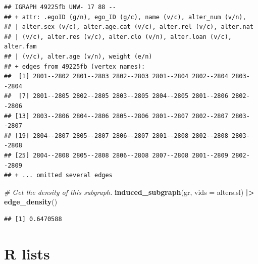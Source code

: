 \documentclass[
]{book}
\newenvironment{Shaded}{\begin{snugshade}}{\end{snugshade}}
\newcommand{\AttributeTok}[1]{\textcolor[rgb]{0.13,0.29,0.53}{#1}}
\newcommand{\CommentTok}[1]{\textcolor[rgb]{0.56,0.35,0.01}{\textit{#1}}}
\newcommand{\FunctionTok}[1]{\textcolor[rgb]{0.13,0.29,0.53}{\textbf{#1}}}
\newcommand{\NormalTok}[1]{#1}
\newcommand{\SpecialCharTok}[1]{\textcolor[rgb]{0.81,0.36,0.00}{\textbf{#1}}}
\begin{document}
\begin{verbatim}
## IGRAPH 49225fb UNW- 17 88 -- 
## + attr: .egoID (g/n), ego_ID (g/c), name (v/c), alter_num (v/n),
## | alter.sex (v/c), alter.age.cat (v/c), alter.rel (v/c), alter.nat
## | (v/c), alter.res (v/c), alter.clo (v/n), alter.loan (v/c), alter.fam
## | (v/c), alter.age (v/n), weight (e/n)
## + edges from 49225fb (vertex names):
##  [1] 2801--2802 2801--2803 2802--2803 2801--2804 2802--2804 2803--2804
##  [7] 2801--2805 2802--2805 2803--2805 2804--2805 2801--2806 2802--2806
## [13] 2803--2806 2804--2806 2805--2806 2801--2807 2802--2807 2803--2807
## [19] 2804--2807 2805--2807 2806--2807 2801--2808 2802--2808 2803--2808
## [25] 2804--2808 2805--2808 2806--2808 2807--2808 2801--2809 2802--2809
## + ... omitted several edges
\end{verbatim}

\begin{Shaded}
\begin{Highlighting}[]
\CommentTok{\# Get the density of this subgraph.}
\FunctionTok{induced\_subgraph}\NormalTok{(gr, }\AttributeTok{vids =}\NormalTok{ alters.sl) }\SpecialCharTok{|\textgreater{}} 
  \FunctionTok{edge\_density}\NormalTok{()}
\end{Highlighting}
\end{Shaded}

\begin{verbatim}
## [1] 0.6470588
\end{verbatim}

\hypertarget{lists}{%
\section{R lists}\label{lists}}
\end{document}
